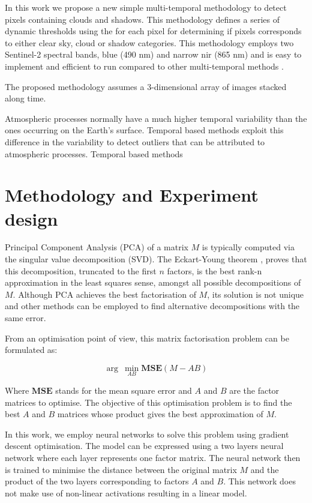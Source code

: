 \documentclass[essd, manuscript]{copernicus}
\begin{document}
In this work we propose a new simple multi-temporal methodology to detect pixels containing clouds and shadows. This methodology defines a series of dynamic thresholds using the for each pixel for determining if pixels corresponds to either clear sky, cloud or shadow categories. This methodology employs two Sentinel-2 spectral bands, blue (490 nm) and narrow nir (865 nm) and is easy to implement and efficient to run compared to other multi-temporal methods \citep{frantz2015enhancing,zhu2018automatic}.

The proposed methodology assumes a 3-dimensional array of images stacked along time. 

Atmospheric processes normally have a much higher temporal variability than the ones occurring on the Earth's surface. Temporal based methods exploit this difference in the variability to detect outliers that can be attributed to atmospheric processes. Temporal based methods  


\section{Methodology and Experiment design}

Principal Component Analysis (PCA) of a matrix $M$ is typically computed via the singular value decomposition (SVD). The Eckart-Young theorem \citep{eckart1936approximation}, proves that this decomposition, truncated to the first $n$ factors, is the best rank-n approximation in the least squares sense, amongst all possible decompositions of $M$. Although PCA achieves the best factorisation of $M$, its solution is not unique and other methods can be employed to find alternative decompositions with the same error. 

From an optimisation point of view, this matrix factorisation problem can be formulated as:

$$
\arg\:\min_{AB} \mathbf{MSE}(M-AB)
$$

Where $\mathbf{MSE}$ stands for the mean square error and $A$ and $B$ are the factor matrices to optimise. The objective of this optimisation problem is to find the best $A$ and $B$ matrices whose product gives the best approximation of $M$.

In this work, we employ neural networks to solve this problem using gradient descent optimisation. The model can be expressed using a two layers neural network where each layer represents one factor matrix. The neural network then is trained to minimise the distance between the original matrix $M$ and the product of the two layers corresponding to factors $A$ and $B$. This network does not make use of non-linear activations resulting in a linear model.
\end{document}
